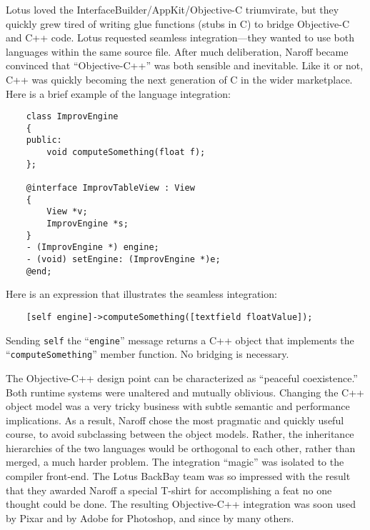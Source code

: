 \documentclass[acmsmall,screen]{acmart}
\begin{document}
Lotus loved the InterfaceBuilder/AppKit/Objective-C triumvirate, but they quickly grew tired of writing glue functions (stubs in C) to bridge Objective-C and C++ code. Lotus requested seamless integration---they wanted to use both languages within the same source file. After much deliberation, Naroff became convinced that ``Objective-C++'' was both sensible and inevitable. Like it or not, C++ was quickly becoming the next generation of C in the wider marketplace. Here is a brief example of the language integration:
\begin{verbatim}
    class ImprovEngine 
    {
    public:
        void computeSomething(float f);
    };

    @interface ImprovTableView : View
    {
        View *v;
        ImprovEngine *s; 
    }
    - (ImprovEngine *) engine; 
    - (void) setEngine: (ImprovEngine *)e; 
    @end;
\end{verbatim}
Here is an expression that illustrates the seamless integration:
\begin{verbatim}
    [self engine]->computeSomething([textfield floatValue]);
\end{verbatim}
Sending \verb$self$ the ``\verb$engine$'' message returns a C++ object that implements the ``\verb$computeSomething$'' member function. No bridging is necessary.

The Objective-C++ design point can be characterized as ``peaceful coexistence.'' Both runtime systems were unaltered and mutually oblivious. Changing the C++ object model was a very tricky business with subtle semantic and performance implications. As a result, Naroff chose the most pragmatic and quickly useful course, to avoid subclassing between the object models. Rather, the inheritance hierarchies of the two languages would be orthogonal to each other, rather than merged, a much harder problem. The integration ``magic'' was isolated to the compiler front-end. The Lotus BackBay team was so impressed with the result that they awarded Naroff a special T-shirt for accomplishing a feat no one thought could be done. The resulting Objective-C++ integration was soon used by Pixar and by Adobe for Photoshop, and since by many others.
\end{document}
